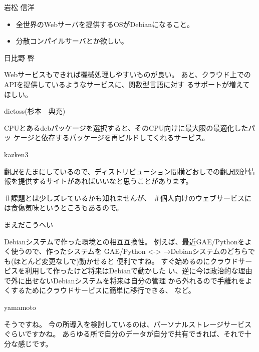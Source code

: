 \begin{prework}{ 岩松 信洋 }
\begin{itemize}
\item 全世界のWebサーバを提供するOSがDebianになること。
\item 分散コンパイルサーバとか欲しい。
\end{itemize}


\end{prework}

\begin{prework}{ 日比野 啓 }

Webサービスもできれば機械処理しやすいものが良い。
あと、クラウド上でのAPIを提供しているようなサービスに、関数型言語に対す
 るサポートが増えてほしい。

\end{prework}

\begin{prework}{ dictoss(杉本　典充) }

CPUとあるdebパッケージを選択すると、そのCPU向けに最大限の最適化したパッ
 ケージと依存するパッケージを再ビルドしてくれるサービス。
\end{prework}

\begin{prework}{ kazken3 }

翻訳をたまにしているので、ディストリビューション間横どおしでの翻訳関連情
 報を提供するサイトがあればいいなと思うことがあります。

＃課題とは少しズレているかも知れませんが、
＃個人向けのウェブサービスには食傷気味というところもあるので。


\end{prework}

\begin{prework}{ まえだこうへい }

Debianシステムで作った環境との相互互換性。
例えば、最近GAE/Pythonをよく使うので、作ったシステムを
 GAE/Python <-> →Debianシステムのどちらでも(ほとんど変更なしで)動かせると
 便利ですね。
すぐ始めるのにクラウドサービスを利用して作ったけど将来はDebianで動かした
 い、逆に今は政治的な理由で外に出せないDebianシステムを将来は自分の管理
 から外れるので手離れをよくするためにクラウドサービスに簡単に移行できる、
 など。
\end{prework}

\begin{prework}{ yamamoto }

そうですね。
今の所導入を検討しているのは、パーソナルストレージサービスぐらいですかね。
あらゆる所で自分のデータが自分で共有できれば、それで十分な感じです。
\end{prework}
